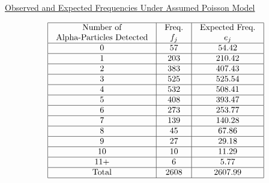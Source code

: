 \documentclass[oneside]{book}
\begin{document}
\underline{Observed and Expected Frequencies Under Assumed Poisson Model}

\[ \begin{array}{|c|c|c|}
        \hline \begin{array}{c}
                   \text{Number of} \\
                   \text{Alpha-Particles Detected}
               \end{array} & \begin{array}{c}
                                 \text{Freq.} \\
                                 f_{j}
                             \end{array} & \begin{array}{c}
                                               \text{Expected Freq.} \\
                                               e_{j}
                                           \end{array}     \\
        \hline 0                        & 57               & 54.42   \\
        \hline 1                        & 203              & 210.42  \\
        \hline 2                        & 383              & 407.43  \\
        \hline 3                        & 525              & 525.54  \\
        \hline 4                        & 532              & 508.41  \\
        \hline 5                        & 408              & 393.47  \\
        \hline 6                        & 273              & 253.77  \\
        \hline 7                        & 139              & 140.28  \\
        \hline 8                        & 45               & 67.86   \\
        \hline 9                        & 27               & 29.18   \\
        \hline 10                       & 10               & 11.29   \\
        \hline 11+                      & 6                & 5.77    \\
        \hline \text{Total}             & 2608             & 2607.99 \\
        \hline
    \end{array} \]
\end{document}
